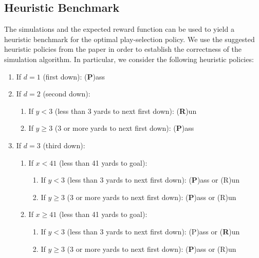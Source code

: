\documentclass[11pt, oneside]{article}   	%
\begin{document}
\subsection{Heuristic Benchmark}
The simulations and the expected reward function can be used to yield a heuristic benchmark for the optimal play-selection policy. We use the suggested heuristic policies from the paper in order to establish the correctness of the simulation algorithm. In particular, we consider the following heuristic policies:
\begin{enumerate}
\item If $d=1$ (first down): (\textbf{P})ass

\item If $d=2$ (second down):
\begin{enumerate}
\item If $y<3$ (less than 3 yards to next first down): (\textbf{R})un
\item If $y\geq3$ (3 or more yards to next first down): (\textbf{P})ass
\end{enumerate}

\item If $d=3$ (third down):
\begin{enumerate}
\item If $x<41$ (less than 41 yards to goal):
\begin{enumerate}
\item If $y<3$ (less than 3 yards to next first down): (\textbf{P})ass or (R)un
\item If $y\geq3$ (3 or more yards to next first down): (\textbf{P})ass or (R)un
\end{enumerate}
\item If $x \geq 41$ (less than 41 yards to goal):
\begin{enumerate}
\item If $y<3$ (less than 3 yards to next first down): (P)ass or (\textbf{R})un
\item If $y\geq3$ (3 or more yards to next first down): (\textbf{P})ass or (R)un
\end{enumerate}
\end{enumerate}


\end{enumerate}
\end{document}
